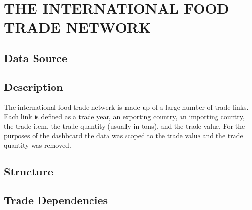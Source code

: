 \chapter{THE INTERNATIONAL FOOD TRADE NETWORK}
\label{foodTradeNetworkChapter}
\section{Data Source}
\section{Description}
The international food trade network is made up of a large number of trade links. Each link is defined as a trade year, an exporting country, an importing country, the trade item, the trade quantity (usually in tons), and the trade value. For the purposes of the dashboard the data was scoped to the trade value and the trade quantity was removed. 

\section{Structure}

\section{Trade Dependencies}

